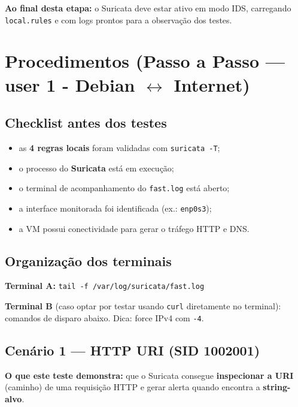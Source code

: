 \begin{notebox}
\textbf{Ao final desta etapa:} o Suricata deve estar ativo em modo IDS, carregando \texttt{local.rules} e com logs prontos para a observação dos testes.
\end{notebox}

\section{Procedimentos (Passo a Passo --- user 1 - Debian $\leftrightarrow$ Internet)}

\subsection*{Checklist antes dos testes}

\begin{itemize}
  \item as \textbf{4 regras locais} foram validadas com \texttt{suricata -T};
  \item o processo do \textbf{Suricata} está em execução;
  \item o terminal de acompanhamento do \texttt{fast.log} está aberto;
  \item a interface monitorada foi identificada (ex.: \texttt{enp0s3});
  \item a VM possui conectividade para gerar o tráfego HTTP e DNS.
\end{itemize}

\subsection*{Organização dos terminais}

\textbf{Terminal A:} \texttt{tail -f /var/log/suricata/fast.log}


\textbf{Terminal B} (caso optar por testar usando \texttt{curl} diretamente no terminal): comandos de disparo abaixo. Dica: force IPv4 com \texttt{-4}.

\subsection{Cenário 1 --- HTTP URI (SID 1002001)}

\textbf{O que este teste demonstra:} que o Suricata consegue \textbf{inspecionar a URI} (caminho) de uma requisição HTTP e gerar alerta quando encontra a \textbf{string-alvo}.

